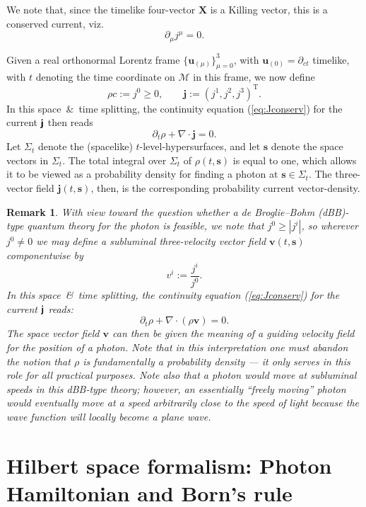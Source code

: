 \documentclass[12pt]{article}
\theoremstyle{definition}
\newtheorem{rem}[thm]{Remark}
\newcommand{\refeq}[1]{(\ref{#1})}
\newcommand{\vect}[1] {\boldsymbol{{ #1}} }
\newcommand{\tenseur}[1]{{\textbf{\textsf{#1}}}}
\newcommand{\bMj}{{\tenseur{j}}}
\newcommand{\jV}{{\vect{j}}}		%
\newcommand{\sV}{{\vect{s}}}            %
\newcommand{\vV}{{\vect{v}}}            %
\numberwithin{equation}{section}
\newcommand{\bu}{\mathbf{u}}
\newcommand{\bX}{\mathbf{X}}
\newcommand{\beq}{\begin{equation}}
\newcommand{\eeq}{\end{equation}}
\newcommand{\p}{\partial}
\newcommand{\cM}{{\mathcal M}}
\newcommand{\Si}{\Sigma}
\newcommand{\nab}{\nabla}
\begin{document}
 We note that, since the timelike four-vector $\bX$ is a Killing vector, this is a conserved current, viz.
\beq \label{eq:Jconserv}
\p_\mu j^\mu = 0.
\eeq

 Given a real orthonormal Lorentz frame $\{\bu_{(\mu)}\}_{\mu = 0}^3$, with $\bu_{(0)}=\p_{ct}$ timelike, with
$t$ denoting the time coordinate on $\cM$ in this frame, we now define 
\beq \label{rhoANDjV}
\rho c:= j^0 \geq 0,\qquad \jV := (j^1,j^2,j^3)^{\mathrm{T}}.
\eeq
In this space\ \&\ time splitting, the continuity equation \refeq{eq:Jconserv} for the current $\bMj$ then reads 
\beq \label{eq:PROBcontinuityEQ}
\p_t \rho + \nab \cdot \jV = 0.
\eeq
 Let $\Si_t$ denote the (spacelike) $t$-level-hypersurfaces, and let $\sV$ denote the space vectors in $\Si_t$. 
  The total integral over $\Si_t$ of $\rho(t,\sV)$ is equal to one, which allows it to be viewed as a probability density
for finding a photon at $\sV\in\Si_t$.
  The three-vector field $\jV(t,\sV)$, then, is the corresponding probability current vector-density. 

\begin{rem}
\textit{With view toward the question whether a de Broglie--Bohm (dBB)-type quantum theory for the photon is feasible,
we note that $j^0 \geq |j^i|$, so wherever $j^0\neq 0$ we may define a subluminal three-velocity vector field $\vV(t,\sV)$ componentwise by
\beq 
 v^i := \frac{j^i}{j^0}.
\eeq
  In this space\ \&\ time splitting, the continuity equation \refeq{eq:Jconserv} for the current $\bMj$ reads:  
\beq \label{eq:PROBcontinuityEQsplit}
\p_t \rho + \nab \cdot ( \rho \vV) = 0.
\eeq
  The space vector field $\vV$ can then be given the meaning of a {\em guiding velocity field} for the position of a photon.
  Note that in this interpretation one {\em must} abandon the notion that $\rho$ is fundamentally a probability density --- 
  it {\em only serves in this role for all practical purposes}.
 Note also that a photon would move at subluminal speeds in this dBB-type theory; however, an essentially ``freely moving'' photon
would eventually move at a speed arbitrarily close to the speed of light because the wave function will locally become a plane
wave.}
\end{rem}
%
\section{Hilbert space formalism: Photon Hamiltonian and Born's rule}\label{sec:HilbertBorn}\vspace{-5pt}
%
\end{document}
